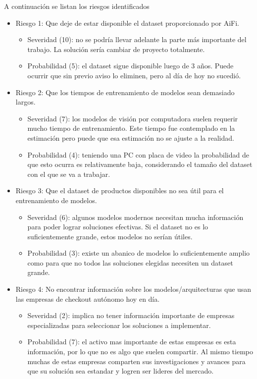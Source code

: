 \documentclass[
11pt, %
]{charter}
\begin{document}
A continuación se listan los riesgos identificados

\begin{itemize}
\item Riesgo 1: Que deje de estar disponible el dataset proporcionado por AiFi.
\begin{itemize}
\item Severidad (10): no se podría llevar adelante la parte más importante del trabajo. La solución sería cambiar de proyecto totalmente.
\item Probabilidad (5): el dataset sigue disponible luego de 3 años. Puede ocurrir que sin previo aviso lo eliminen, pero al día de hoy no sucedió.
\end{itemize}
\item Riesgo 2: Que los tiempos de entrenamiento de modelos sean demasiado largos.
\begin{itemize}
\item Severidad (7): los modelos de visión por computadora suelen requerir mucho tiempo de entrenamiento. Este tiempo fue contemplado en la estimación pero puede que esa estimación no se ajuste a la realidad.
\item Probabilidad (4): teniendo una PC con placa de video la probabilidad de que esto ocurra es relativamente baja, considerando el tamaño del dataset con el que se va a trabajar.
\end{itemize}
\item Riesgo 3: Que el dataset de productos disponibles no sea útil para el entrenamiento de modelos.
\begin{itemize}
\item Severidad (6): algunos modelos modernos necesitan mucha información para poder lograr soluciones efectivas. Si el dataset no es lo suficientemente grande, estos modelos no serían útiles.
\item Probabilidad (3): existe un abanico de modelos lo suficientemente amplio como para que no todos las soluciones elegidas necesiten un dataset grande.
\end{itemize}
\item Riesgo 4: No encontrar información sobre los modelos/arquitecturas que usan las empresas de checkout autónomo hoy en día.
\begin{itemize}
\item Severidad (2): implica no tener información importante de empresas especializadas para seleccionar los soluciones a implementar. 
\item Probabilidad (7): el activo mas importante de estas empresas es esta información, por lo que no es algo que suelen compartir. Al mismo tiempo muchas de estas empresas comparten sus investigaciones y avances para que su solución sea estandar y logren ser lideres del mercado.

\end{itemize}
\end{itemize}
\end{document}
